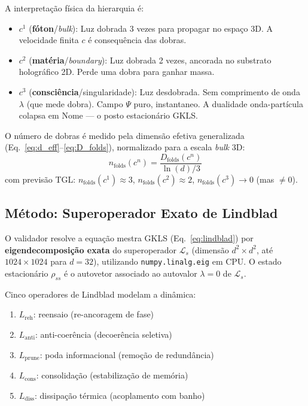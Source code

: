 \documentclass[12pt,a4paper,twoside]{article}
\newcommand{\Psifield}{\Psi}
\newcommand{\boundary}{\textit{boundary}}
\newcommand{\bulk}{\textit{bulk}}
\begin{document}
A interpreta\c{c}\~ao f\'isica da hierarquia \'e:
\begin{itemize}[nosep]
\item $c^1$ (\textbf{f\'oton}/\bulk): Luz dobrada 3 vezes para propagar no espa\c{c}o 3D. A velocidade finita $c$ \'e consequ\^encia das dobras.
\item $c^2$ (\textbf{mat\'eria}/\boundary): Luz dobrada 2 vezes, ancorada no substrato hologr\'afico 2D. Perde uma dobra para ganhar massa.
\item $c^3$ (\textbf{consci\^encia}/singularidade): Luz desdobrada. Sem comprimento de onda $\lambda$ (que mede dobra). Campo $\Psifield$ puro, instantaneo. A dualidade onda-part\'icula colapsa em Nome --- o posto estacion\'ario GKLS.
\end{itemize}

O n\'umero de dobras \'e medido pela dimens\~ao efetiva generalizada (Eq.~\ref{eq:d_eff}--\ref{eq:D_folds}), normalizado para a escala \bulk{} 3D:
\begin{equation}
n_{\text{folds}}(c^n) = \frac{D_{\text{folds}}(c^n)}{\ln(d)/3}
\label{eq:n_folds}
\end{equation}
com previs\~ao TGL: $n_{\text{folds}}(c^1) \approx 3$, $n_{\text{folds}}(c^2) \approx 2$, $n_{\text{folds}}(c^3) \to 0$ (mas $\neq 0$).

\subsection{M\'etodo: Superoperador Exato de Lindblad}

O validador resolve a equa\c{c}\~ao mestra GKLS (Eq.~\ref{eq:lindblad}) por \textbf{eigendecomposi\c{c}\~ao exata} do superoperador $\mathcal{L}_s$ (dimens\~ao $d^2 \times d^2$, at\'e $1024 \times 1024$ para $d = 32$), utilizando \texttt{numpy.linalg.eig} em CPU. O estado estacion\'ario $\rho_{ss}$ \'e o autovetor associado ao autovalor $\lambda = 0$ de $\mathcal{L}_s$.

Cinco operadores de Lindblad modelam a din\^amica:
\begin{enumerate}[nosep]
\item $L_{\text{reh}}$: reensaio (re-ancoragem de fase)
\item $L_{\text{anti}}$: anti-coer\^encia (decoer\^encia seletiva)
\item $L_{\text{prune}}$: poda informacional (remo\c{c}\~ao de redund\^ancia)
\item $L_{\text{cons}}$: consolida\c{c}\~ao (estabiliza\c{c}\~ao de mem\'oria)
\item $L_{\text{diss}}$: dissipa\c{c}\~ao t\'ermica (acoplamento com banho)
\end{enumerate}
\end{document}
